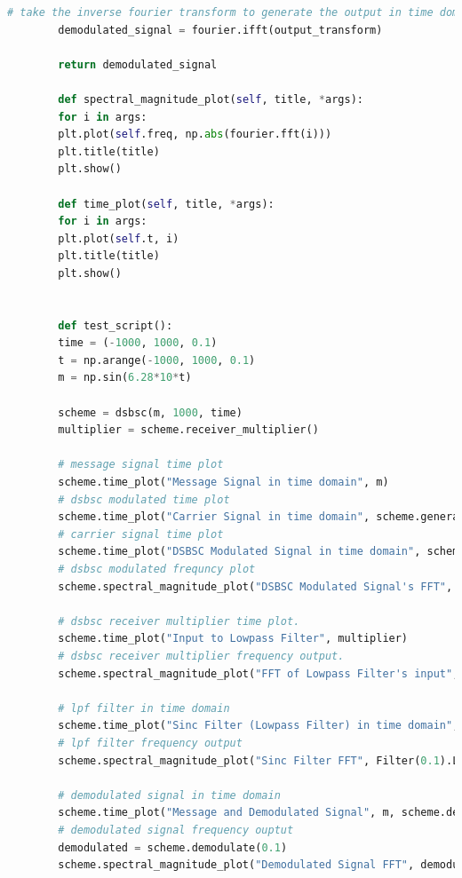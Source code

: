 \documentclass[12pt,a4paper]{article}%
\begin{document}
\begin{flushleft}
\begin{lstlisting}[language=python,caption={Mod Demod Codes}]
		# take the inverse fourier transform to generate the output in time domain.
		demodulated_signal = fourier.ifft(output_transform)
		
		return demodulated_signal
		
		def spectral_magnitude_plot(self, title, *args):
		for i in args:
		plt.plot(self.freq, np.abs(fourier.fft(i)))
		plt.title(title)
		plt.show()
		
		def time_plot(self, title, *args):
		for i in args:
		plt.plot(self.t, i)
		plt.title(title)
		plt.show()
		
		
		def test_script():
		time = (-1000, 1000, 0.1)
		t = np.arange(-1000, 1000, 0.1)
		m = np.sin(6.28*10*t)
		
		scheme = dsbsc(m, 1000, time)
		multiplier = scheme.receiver_multiplier()
		
		# message signal time plot
		scheme.time_plot("Message Signal in time domain", m)
		# dsbsc modulated time plot
		scheme.time_plot("Carrier Signal in time domain", scheme.generate_carrier())
		# carrier signal time plot
		scheme.time_plot("DSBSC Modulated Signal in time domain", scheme.modulate())
		# dsbsc modulated frequncy plot
		scheme.spectral_magnitude_plot("DSBSC Modulated Signal's FFT", scheme.modulate())
		
		# dsbsc receiver multiplier time plot.
		scheme.time_plot("Input to Lowpass Filter", multiplier)
		# dsbsc receiver multiplier frequency output.
		scheme.spectral_magnitude_plot("FFT of Lowpass Filter's input", multiplier)
		
		# lpf filter in time domain
		scheme.time_plot("Sinc Filter (Lowpass Filter) in time domain", Filter(0.1).LPF())
		# lpf filter frequency output
		scheme.spectral_magnitude_plot("Sinc Filter FFT", Filter(0.1).LPF())
		
		# demodulated signal in time domain
		scheme.time_plot("Message and Demodulated Signal", m, scheme.demodulate(0.1)/16.0)
		# demodulated signal frequency ouptut
		demodulated = scheme.demodulate(0.1)
		scheme.spectral_magnitude_plot("Demodulated Signal FFT", demodulated)
		\end{lstlisting}

\end{flushleft}
\end{document}
